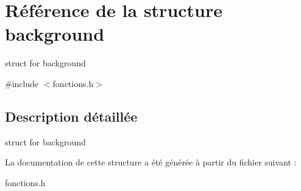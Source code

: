 \hypertarget{structbackground}{}\section{Référence de la structure background}
\label{structbackground}


struct for background  




{\ttfamily \#include $<$fonctions.\+h$>$}



\subsection{Description détaillée}
struct for background 

La documentation de cette structure a été générée à partir du fichier suivant \+:\begin{DoxyCompactItemize}
\item 
fonctions.\+h\end{DoxyCompactItemize}

